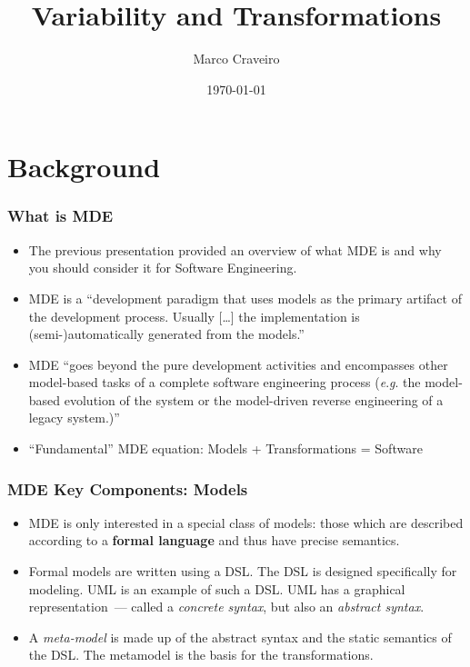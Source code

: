 \documentclass{beamer}
\title{Variability and Transformations}
\author{Marco Craveiro}
\date{\today}
\newcommand{\eg}{\textit{e}.\textit{g}. }
\begin{document}

\section{Background}

\begin{frame}
\frametitle{What is \ac{MDE}}

\begin{itemize}
\item The previous presentation provided an overview of what \ac{MDE}
  is and why you should consider it for Software Engineering.

\pause

\item \ac{MDE} is a ``development paradigm that uses models as the
  primary artifact of the development process. Usually [\ldots] the
  implementation is (semi-)automatically generated from the
  models.''\cite{brambilla2012model}

\pause

\item \ac{MDE} ``goes beyond the pure development activities and
  encompasses other model-based tasks of a complete software
  engineering process (\eg the model-based evolution of the system or
  the model-driven reverse engineering of a legacy
  system.)''\cite{brambilla2012model}

\pause

\item ``Fundamental'' \ac{MDE} equation: Models + Transformations =
  Software

\end{itemize}

\end{frame}

\begin{frame}
\frametitle{\ac{MDE} Key Components: Models}

\begin{itemize}

\item \ac{MDE} is only interested in a special class of models: those
  which are described according to a \textbf{formal language} and thus
  have precise semantics.

\pause

\item Formal models are written using a \acf{DSL}. The \ac{DSL} is
  designed specifically for modeling. \acf{UML} is an example of such
  a \ac{DSL}. \ac{UML} has a graphical representation~--- called a
  \emph{concrete syntax}, but also an \emph{abstract syntax}.

\pause

\item A \emph{meta-model} is made up of the abstract syntax and the
  static semantics of the \ac{DSL}. The metamodel is the basis for the
  transformations.

\end{itemize}

\end{frame}
\end{document}
